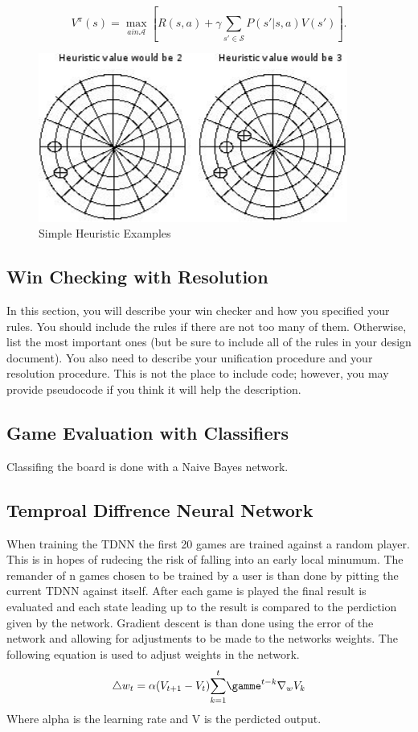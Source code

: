 \documentclass[12pt,letterpaper]{article}
\begin{document}
\[
V^\pi(s)=\max_{a in \mathcal{A}} \left[ R(s,a) + \gamma \sum_{s' \in \mathcal{S}} P(s'|s,a) V(s') \right].
\]

\begin{figure}
\begin{center}
\includegraphics[width=4in]{heu.png}
\end{center}
\caption{Simple Heuristic Examples}
\label{heuristicExample}
\end{figure}

\subsection{Win Checking with Resolution}
In this section, you will describe your win checker and how you specified your rules. 
You should include the rules if there are not too many of them. Otherwise, list the most important
ones (but be sure to include all of the rules in your design document). You also need to describe 
your unification procedure and your resolution procedure. This is not the place to include code; 
however, you may provide pseudocode if you think it will help the description.

\subsection{Game Evaluation with Classifiers}
Classifing the board is done with a Naive Bayes network. 

\subsection{Temproal Diffrence Neural Network}
When training the TDNN the first 20 games are trained against a random player. This is in hopes of rudecing the risk of falling into an early local minumum. The remander of n games chosen to be trained by a user is than done by pitting the current TDNN against itself. After each game is played the final result is evaluated and each state leading up to the result is compared to the perdiction given by the network. Gradient descent is than done using the error of the network and allowing for adjustments to be made to the networks weights. The following equation is used to adjust weights in the network. 
\[
{\triangle} w_t = \alpha (V _{t + 1} - V _t)  \overset{t}{\sum_{k = 1}} {\gamme}^{t - k} {\nabla}_w V_k
\]
Where alpha is the learning rate and V is the perdicted output.
\end{document}
